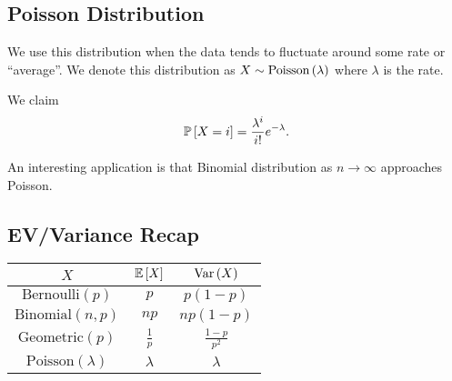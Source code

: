 \subsection{Poisson Distribution}
We use this distribution when the data tends to fluctuate around some rate or ``average''. We denote this distribution as $X \sim \text{Poisson}\left( \lambda \right)$ where $\lambda$ is the rate. 

We claim \[ \mathbb{P}\left[ X = i \right] = \dfrac{{\lambda}^{i}}{i !} e^{- {\lambda}}. \]

An interesting application is that Binomial distribution as $n \to \infty$ approaches Poisson.

\subsection{EV/Variance Recap}

\begin{center}
    \begin{tabular}{|c|c|c|}
        \hline 
        $X$ & $\mathbb{E}\left[ X \right]$ & $\text{Var}\left( X \right)$ \\
        \hline
        $\text{Bernoulli}(p)$ & $p$ & $p(1-p)$ \\
        \hline
        $\text{Binomial}(n,p)$ & $np$ & $np(1-p)$ \\
        \hline
        $\text{Geometric}(p)$ & $\frac{1}{p}$ & $\frac{1-p}{p^2}$ \\
        \hline
        $\text{Poisson}(\lambda)$ & $\lambda$ & $\lambda$ \\
        \hline
    \end{tabular}
\end{center}